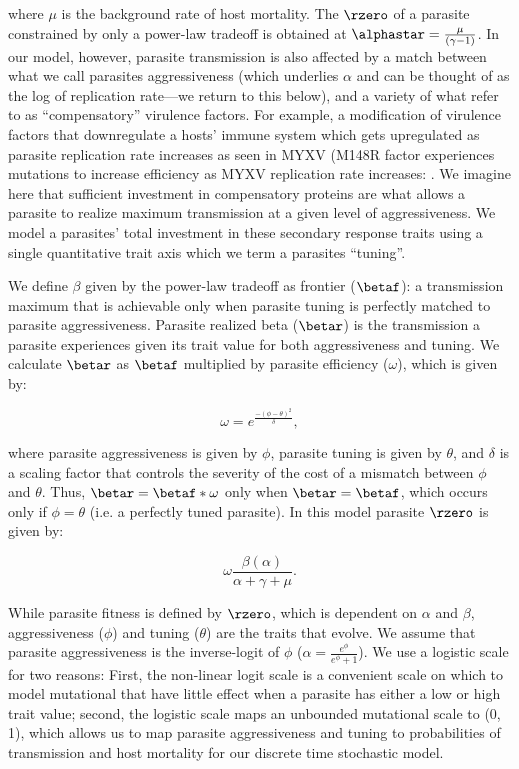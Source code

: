 \noindent where $\mu$ is the background rate of host mortality. The $\rzero$ of a parasite constrained by only a power-law tradeoff is obtained at $\alphastar = \frac{\mu}{(\gamma - 1)}$. In our model, however, parasite transmission is also affected by a match between what we call parasites aggressiveness (which underlies $\alpha$ and can be thought of as the log of replication rate---we return to this below), and a variety of what refer to as ``compensatory'' virulence factors. For example, a modification of virulence factors that downregulate a hosts' immune system which gets upregulated as parasite replication rate increases as seen in MYXV (M148R factor experiences mutations to increase efficiency as MYXV replication rate increases: \citealt{Blanieetal.2009}. We imagine here that sufficient investment in compensatory proteins are what allows a parasite to realize maximum transmission at a given level of aggressiveness. We model a parasites' total investment in these secondary response traits using a single quantitative trait axis which we term a parasites ``tuning''. 

We define $\beta$ given by the power-law tradeoff as frontier ($\betaf$): a transmission maximum that is achievable only when parasite tuning is perfectly matched to parasite aggressiveness. Parasite realized beta ($\betar$) is the transmission a parasite experiences given its trait value for both aggressiveness and tuning. We calculate $\betar$ as $\betaf$ multiplied by parasite efficiency ($\omega$), which is given by:

\begin{equation*}
\omega = e^{\frac{-(\phi - \theta)^2}{\delta}},
\end{equation*}

where parasite aggressiveness is given by $\phi$, parasite tuning is given by $\theta$, and $\delta$ is a scaling factor that controls the severity of the cost of a mismatch between $\phi$ and $\theta$. Thus, $\betar = \betaf * \omega$ only when $\betar = \betaf$, which occurs only if $\phi = \theta$ (i.e. a perfectly tuned parasite). In this model parasite $\rzero$ is given by:

\begin{equation*}
\omega \frac{\beta(\alpha)}{\alpha + \gamma + \mu}.
\end{equation*}

While parasite fitness is defined by $\rzero$, which is dependent on $\alpha$ and $\beta$, aggressiveness ($\phi$) and tuning ($\theta$) are the traits that evolve. We assume that parasite aggressiveness is the inverse-logit of $\phi$ ($\alpha = \frac{e^{\phi}}{e^{\phi} + 1}$). We use a logistic scale for two reasons: First, the non-linear logit scale is a convenient scale on which to model mutational that have little effect when a parasite has either a low or high trait value; second, the logistic scale maps an unbounded mutational scale to (0, 1), which allows us to map parasite aggressiveness and tuning to probabilities of transmission and host mortality for our discrete time stochastic model.

